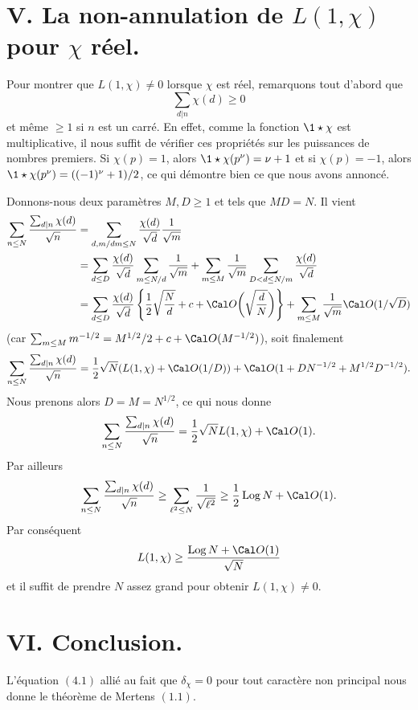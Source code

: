 \section{V. La non-annulation de $L(1,\chi)$ pour $\chi$ r\'eel.}

Pour montrer que $L(1,\chi)\neq0$ lorsque $\chi$ est r\'eel,
remarquons tout d'abord que
$$
\sum_{d|n}\chi(d)\ge0
$$
et m\^eme $\ge 1$ si $n$ est un carr\'e. En effet, comme la fonction
$\1\star\chi$ est multiplicative, il nous suffit de v\'erifier ces
propri\'et\'es sur les puissances de nombres premiers. Si $\chi(p)=1$,
alors $\1\star\chi(p^{\nu})=\nu+1$ et si $\chi(p)=-1$, alors
$\1\star\chi(p^{\nu})=((-1)^{\nu}+1)/2$, ce qui d\'emontre bien ce que
nous avons annonc\'e.

Donnons-nous deux param\`etres $M,D\ge1$ et tels que $MD=N$.
Il vient
$$
\aligned
\sum_{n\le N}\frac{{\sum_{d|n}\chi(d)}}{\sqrt{n}}
&=
\sum_{d, m/ dm\le N}\frac{\chi(d)}{\sqrt{d}}\frac1{\sqrt{m}}
\\&=
\sum_{d\le D}\frac{\chi(d)}{\sqrt{d}}\sum_{m\le N/d}\frac1{\sqrt{m}}
+
\sum_{m\le M}\frac1{\sqrt{m}}\sum_{D<d\le N/m}\frac{\chi(d)}{\sqrt{d}}
\\&=
\sum_{d\le D}\frac{\chi(d)}{\sqrt{d}}
\left\{
\frac12\sqrt{\frac{N}{d}}+c+\Cal O\bigg(\sqrt{\frac{d}{N}}\bigg)
\right\}
+\sum_{m\le M}\frac1{\sqrt{m}}\Cal O(1/\sqrt{D})
\endaligned
$$
(car $\sum_{m\le M}m^{-1/2}=M^{1/2}/2+c+\Cal O(M^{-1/2})$),
soit finalement
$$
\sum_{n\le N}\frac{{\sum_{d|n}\chi(d)}}{\sqrt{n}}
=\frac12\sqrt{{N}}(L(1,\chi)+\Cal O(1/D))
+\Cal O(1+ D N^{-1/2}+M^{1/2}D^{-1/2}).
$$
Nous prenons alors $D=M=N^{1/2}$, ce qui nous donne
$$
\sum_{n\le N}\frac{{\sum_{d|n}\chi(d)}}{\sqrt{n}}
=\frac12\sqrt{{N}}L(1,\chi)
+\Cal O(1)
.
$$
Par ailleurs
$$
\sum_{n\le N}\frac{{\sum_{d|n}\chi(d)}}{\sqrt{n}}
\ge \sum_{\ell^2\le N}\frac{1}{\sqrt{\ell^2}}
\ge \frac12\Log N+\Cal O(1).
$$
Par cons\'equent
$$
L(1,\chi)\ge\frac{\Log N+\Cal O(1)}{\sqrt{N}}
$$
et il suffit de prendre $N$ assez grand pour obtenir $L(1,\chi)\ne0$.

\section{VI. Conclusion.}

L'\'equation $(4.1)$ alli\'e au fait que $\delta_\chi=0$ pour tout
caract\`ere non principal nous donne le th\'eor\`eme de Mertens
$(1.1)$.

